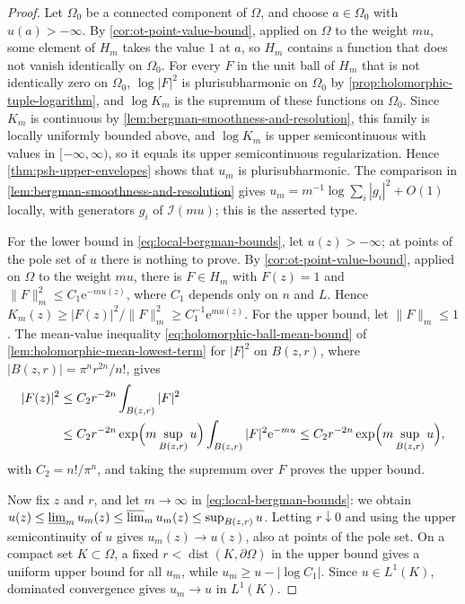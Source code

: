 \begin{proof}
Let $\Omega_0$ be a connected component of $\Omega$, and choose $a\in\Omega_0$ with $u(a)>-\infty$. By \cref{cor:ot-point-value-bound}, applied on $\Omega$ to the weight $mu$, some element of $H_m$ takes the value $1$ at $a$, so $H_m$ contains a function that does not vanish identically on $\Omega_0$. For every $F$ in the unit ball of $H_m$ that is not identically zero on $\Omega_0$, $\log|F|^2$ is plurisubharmonic on $\Omega_0$ by \cref{prop:holomorphic-tuple-logarithm}, and $\log K_m$ is the supremum of these functions on $\Omega_0$. Since $K_m$ is continuous by \cref{lem:bergman-smoothness-and-resolution}, this family is locally uniformly bounded above, and $\log K_m$ is upper semicontinuous with values in $[-\infty,\infty)$, so it equals its upper semicontinuous regularization. Hence \cref{thm:psh-upper-envelopes} shows that $u_m$ is plurisubharmonic. The comparison in \cref{lem:bergman-smoothness-and-resolution} gives $u_m=m^{-1}\log\sum_i|g_i|^2+O(1)$ locally, with generators $g_i$ of $\mathcal I(mu)$; this is the asserted type.

For the lower bound in \eqref{eq:local-bergman-bounds}, let $u(z)>-\infty$; at points of the pole set of $u$ there is nothing to prove. By \cref{cor:ot-point-value-bound}, applied on $\Omega$ to the weight $mu$, there is $F\in H_m$ with $F(z)=1$ and $\|F\|_m^2\leq C_1\mathrm e^{-mu(z)}$, where $C_1$ depends only on $n$ and $L$. Hence $K_m(z)\geq|F(z)|^2/\|F\|_m^2\geq C_1^{-1}\mathrm e^{mu(z)}$. For the upper bound, let $\|F\|_m\leq1$. The mean-value inequality \eqref{eq:holomorphic-ball-mean-bound} of \cref{lem:holomorphic-mean-lowest-term} for $|F|^2$ on $B(z,r)$, where $|B(z,r)|=\pi^nr^{2n}/n!$, gives
\begin{align*}
 |F(z)|^2&\leq C_2r^{-2n}\int_{B(z,r)}|F|^2\\
       &\leq C_2r^{-2n}\exp\Bigl(m\sup_{B(z,r)}u\Bigr)\int_{B(z,r)}|F|^2\mathrm e^{-mu}
       \leq C_2r^{-2n}\exp\Bigl(m\sup_{B(z,r)}u\Bigr),
\end{align*}
with $C_2=n!/\pi^n$, and taking the supremum over $F$ proves the upper bound.

Now fix $z$ and $r$, and let $m\to\infty$ in \eqref{eq:local-bergman-bounds}: we obtain $u(z)\leq\varliminf_mu_m(z)\leq\varlimsup_mu_m(z)\leq\sup_{B(z,r)}u$. Letting $r\downarrow0$ and using the upper semicontinuity of $u$ gives $u_m(z)\to u(z)$, also at points of the pole set. On a compact set $K\subset\Omega$, a fixed $r<\operatorname{dist}(K,\partial\Omega)$ in the upper bound gives a uniform upper bound for all $u_m$, while $u_m\geq u-|\log C_1|$. Since $u\in L^1(K)$, dominated convergence gives $u_m\to u$ in $L^1(K)$.


\end{proof}

